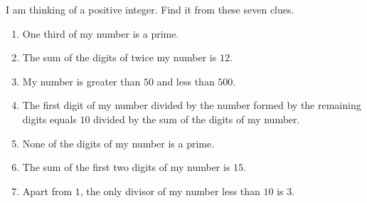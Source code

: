 I am thinking of a positive integer. Find it from these seven clues.
\begin{enumerate}
\item One third of my number is a prime.
\item The sum of the digits of twice my number is $12$.
\item My number is greater than $50$ and less than $500$.
\item The first digit of my number divided by the number formed by the remaining digits equals $10$ divided by the sum of the digits of my number.
\item None of the digits of my number is a prime.
\item The sum of the first two digits of my number is $15$.
\item Apart from $1$, the only divisor of my number less than $10$ is $3$.
\end{enumerate}

